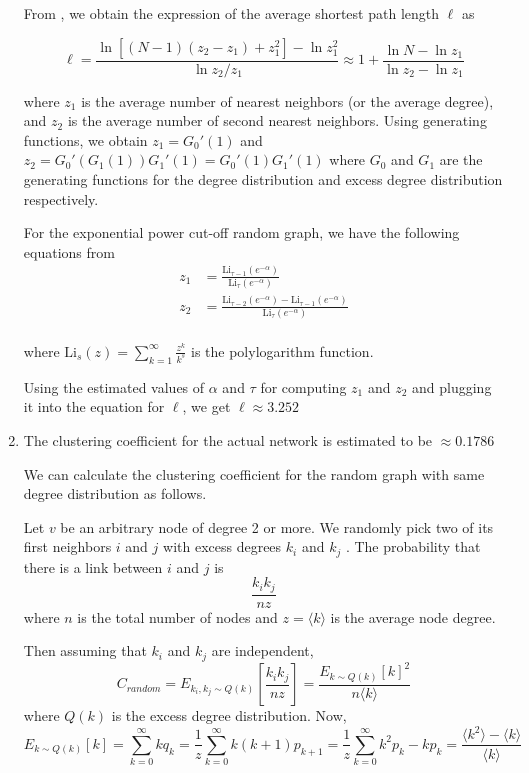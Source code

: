 \documentclass{article}
\newcommand{\Li}{\text{Li}}
\begin{document}
\begin{enumerate}
From \cite{newman}, we obtain the expression of the average shortest path length $\ell$ as 

$$ \ell = \frac{\ln [ (N-1)(z_2 - z_1) + z_1^2 ] -  \ln z_1^2}{\ln z_2/z_1} \approx 1 + \frac{\ln N - \ln z_1}{\ln z_2 - \ln z_1}$$

where $z_1$ is the average number of nearest neighbors (or the average degree), and $z_2$ is the average number of second nearest neighbors. Using generating functions, we obtain $z_1 = G_0'(1)$ and $z_2 = G_0'(G_1(1))G_1'(1) = G_0'(1)G_1'(1) $ where $G_0$ and $G_1$ are the generating functions for the degree distribution and excess degree distribution respectively. 

For the exponential power cut-off random graph, we have the following equations from \cite{newman}
\begin{align}
z_1 &= \frac{\Li_{\tau - 1}(e^{-\alpha})}{\Li_{\tau }(e^{-\alpha})} \\
z_2 &= \frac{\Li_{\tau - 2}(e^{-\alpha})-\Li_{\tau - 1}(e^{-\alpha})}{\Li_{\tau }(e^{-\alpha})}\\
\end{align}

where $\Li_s(z) = \sum_{k=1}^\infty \frac{z^k}{k^s}$ is the polylogarithm function.  

Using the estimated values of $\alpha$ and $\tau$ for computing $z_1$ and $z_2$ and plugging it into the equation for $\ell$, we get $\ell \approx 3.252$

\item The clustering coefficient for the actual network is estimated to be $\approx 0.1786$

We can calculate the clustering coefficient for the random graph with same degree distribution as follows. 

Let $v$ be an arbitrary node of degree 2 or more. We randomly pick two of its first neighbors $i$ and $j$ with excess degrees $k_i$ and $k_j$ . The probability that there is a link between $i$ and $j$ is $$\frac{k_i k_j}{nz}$$
where $n$ is the total number of nodes and $z = \langle k \rangle$ is the average node degree.

Then assuming that $k_i$ and $k_j$ are independent, $$ C_{random} = E_{k_i, k_j \sim Q(k)}\left[\frac{k_i k_j}{nz}\right] = \frac{ E_{k \sim Q(k)}[k]^2 }{n \langle k \rangle}$$ where $Q(k)$ is the excess degree distribution. Now, $$ E_{k \sim Q(k)}[k] = \sum_{k=0}^\infty kq_k = \frac{1}{z} \sum_{k=0}^\infty k(k+1)p_{k+1} = \frac{1}{z} \sum_{k=0}^\infty k^2 p_{k} - k p_k = \frac{\langle k^2 \rangle - \langle k \rangle}{\langle k \rangle} $$


\end{enumerate}
\end{document}
